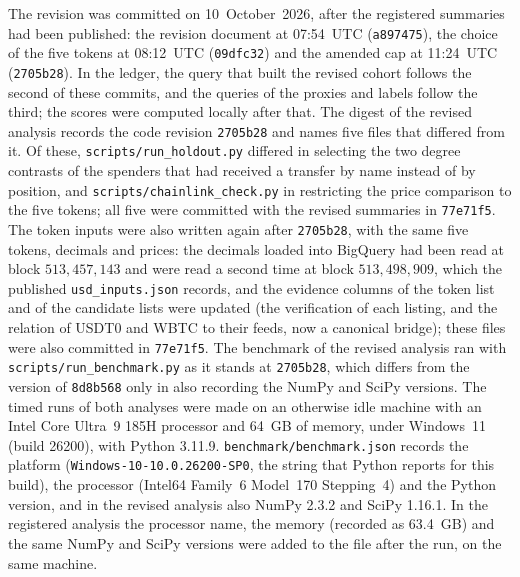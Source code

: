 The revision was committed on 10~October~2026, after the registered summaries had been published: the revision document at 07:54~UTC (\texttt{a897475}), the choice of the five tokens at 08:12~UTC (\texttt{09dfc32}) and the amended cap at 11:24~UTC (\texttt{2705b28}). In the ledger, the query that built the revised cohort follows the second of these commits, and the queries of the proxies and labels follow the third; the scores were computed locally after that. The digest of the revised analysis records the code revision \texttt{2705b28} and names five files that differed from it. Of these, \texttt{scripts/run\_holdout.py} differed in selecting the two degree contrasts of the spenders that had received a transfer by name instead of by position, and \texttt{scripts/chainlink\_check.py} in restricting the price comparison to the five tokens; all five were committed with the revised summaries in \texttt{77e71f5}. The token inputs were also written again after \texttt{2705b28}, with the same five tokens, decimals and prices: the decimals loaded into BigQuery had been read at block $513{,}457{,}143$ and were read a second time at block $513{,}498{,}909$, which the published \texttt{usd\_inputs.json} records, and the evidence columns of the token list and of the candidate lists were updated (the verification of each listing, and the relation of USDT0 and WBTC to their feeds, now a canonical bridge); these files were also committed in \texttt{77e71f5}. The benchmark of the revised analysis ran with \texttt{scripts/run\_benchmark.py} as it stands at \texttt{2705b28}, which differs from the version of \texttt{8d8b568} only in also recording the NumPy and SciPy versions. The timed runs of both analyses were made on an otherwise idle machine with an Intel Core Ultra~9 185H processor and 64~GB of memory, under Windows~11 (build 26200), with Python 3.11.9. \texttt{benchmark/benchmark.json} records the platform (\texttt{Windows-10-10.0.26200-SP0}, the string that Python reports for this build), the processor (Intel64 Family~6 Model~170 Stepping~4) and the Python version, and in the revised analysis also NumPy 2.3.2 and SciPy 1.16.1. In the registered analysis the processor name, the memory (recorded as 63.4~GB) and the same NumPy and SciPy versions were added to the file after the run, on the same machine.

